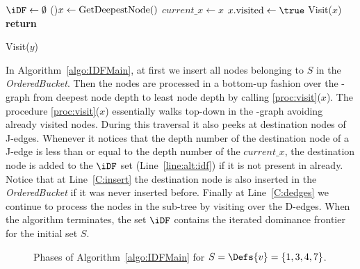 {\begin{algorithm}

  $\iDF \gets \emptyset$\;
  \While(){$x \gets \textrm{GetDeepestNode}()$}{  \label{C:get} 
    $\textit{current\_x} \gets x$\;
    $x.\visited \gets \true$\;
    Visit($x$)
  }
  \textbf{return} \iDF
\end{algorithm}

\begin{procedure}
  \caption{Visit($y$)}
  \label{proc:visit}
\end{procedure}

In Algorithm~\ref{algo:IDFMain}, at first we insert all nodes belonging to $S$ in the \textit{OrderedBucket}. 
Then the nodes are processed in a bottom-up fashion over the \DJ-graph from deepest node depth to least node depth by calling \ref{proc:visit}($x$). 
The procedure \ref{proc:visit}($x$) essentially walks top-down in the \DJ-graph avoiding already visited nodes. 
During this traversal it also peeks at destination nodes of J-edges.  Whenever 
it notices that the depth number of the destination node of a J-edge is less 
than or equal to the depth number of the $\textit{current\_x}$, the destination 
node is added to the $\iDF$ set (Line~\ref{line:alt:idf}) if it is not present 
in \iDF already.  Notice that at Line~\ref{C:insert} the destination node is 
also inserted in the {\it OrderedBucket} if it was never inserted before.  
Finally at Line~\ref{C:dedges} we continue to process the nodes in the sub-tree 
by visiting over the D-edges.  When the algorithm terminates, the set $\iDF$ 
contains the iterated dominance frontier for the initial set $S$.

\begin{figure}[htb]
    \centerline{}
    \caption{Phases of Algorithm~\ref{algo:IDFMain} for $S=\Defs{v}=\{1,3,4,7\}$.}
    \label{fig:sreedhargao}
    \end{figure} 


}
